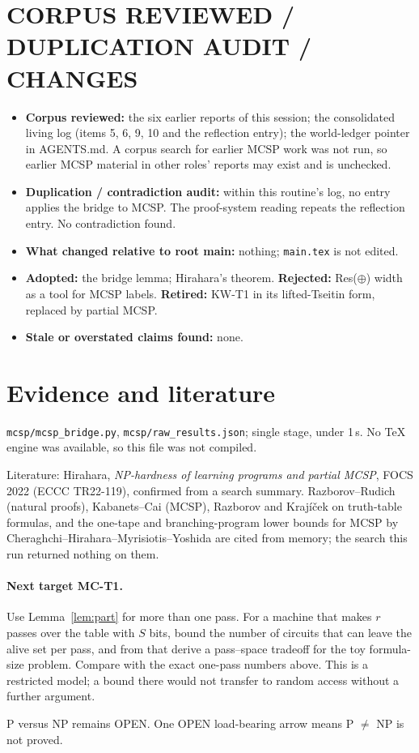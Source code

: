 \documentclass[11pt]{article}
\begin{document}
\section{CORPUS REVIEWED / DUPLICATION AUDIT / CHANGES}
\begin{itemize}
\item \textbf{Corpus reviewed:} the six earlier reports of this session; the consolidated living log (items 5, 6, 9, 10 and the reflection entry); the world-ledger pointer in AGENTS.md. A corpus search for earlier MCSP work was not run, so earlier MCSP material in other roles' reports may exist and is unchecked.
\item \textbf{Duplication / contradiction audit:} within this routine's log, no entry applies the bridge to MCSP. The proof-system reading repeats the reflection entry. No contradiction found.
\item \textbf{What changed relative to root main:} nothing; \texttt{main.tex} is not edited.
\item \textbf{Adopted:} the bridge lemma; Hirahara's theorem. \textbf{Rejected:} Res($\oplus$) width as a tool for MCSP labels. \textbf{Retired:} KW-T1 in its lifted-Tseitin form, replaced by partial MCSP.
\item \textbf{Stale or overstated claims found:} none.
\end{itemize}

\section{Evidence and literature}
\texttt{mcsp/mcsp\_bridge.py}, \texttt{mcsp/raw\_results.json}; single stage, under 1\,s. No TeX engine was available, so this file was not compiled.

Literature: Hirahara, \emph{NP-hardness of learning programs and partial MCSP}, FOCS 2022 (ECCC TR22-119), confirmed from a search summary. Razborov--Rudich (natural proofs), Kabanets--Cai (MCSP), Razborov and Kraj\'i\v{c}ek on truth-table formulas, and the one-tape and branching-program lower bounds for MCSP by Cheraghchi--Hirahara--Myrisiotis--Yoshida are cited from memory; the search this run returned nothing on them.

\paragraph{Next target MC-T1.} Use Lemma~\ref{lem:part} for more than one pass. For a machine that makes $r$ passes over the table with $S$ bits, bound the number of circuits that can leave the alive set per pass, and from that derive a pass--space tradeoff for the toy formula-size problem. Compare with the exact one-pass numbers above. This is a restricted model; a bound there would not transfer to random access without a further argument.

\medskip\noindent P versus NP remains OPEN. One OPEN load-bearing arrow means P $\ne$ NP is not proved.
\end{document}
